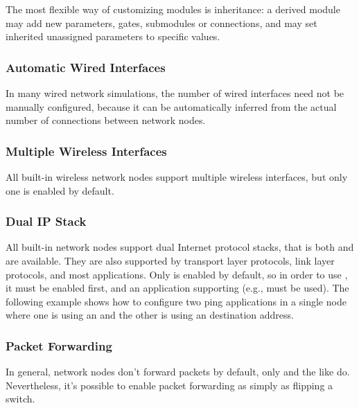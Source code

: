 The most flexible way of customizing modules is inheritance: a derived module may add new parameters, gates, submodules or connections, and may set inherited unassigned parameters to specific values.

\subsubsection*{Automatic Wired Interfaces}

In many wired network simulations, the number of wired interfaces need not be manually configured, because it can be automatically inferred from the actual number of connections between network nodes.


\subsubsection*{Multiple Wireless Interfaces}

All built-in wireless network nodes support multiple wireless interfaces, but only one is enabled by default.


\subsubsection*{Dual IP Stack}

All built-in network nodes support dual Internet protocol stacks, that is both  and  are available. They are also supported by transport layer protocols, link layer protocols, and most applications. Only  is enabled by default, so in order to use , it must be enabled first, and an application supporting  (e.g.,  must be used). The following example shows how to configure two ping applications in a single node where one is using an  and the other is using an  destination address.


\subsubsection*{Packet Forwarding}

In general, network nodes don't forward packets by default, only  and the like do. Nevertheless, it's possible to enable packet forwarding as simply as flipping a switch.

